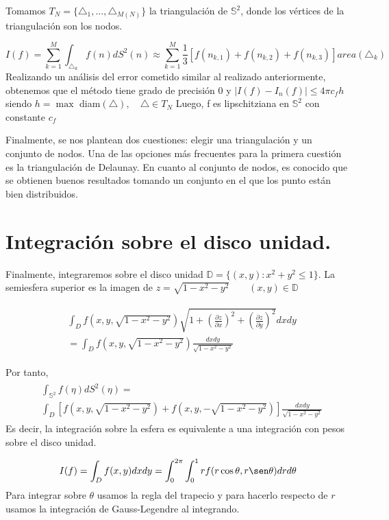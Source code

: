 \medskip
Tomamos $T_N=\{\triangle_1,...,\triangle_{M(N)}\}$ la triangulación de $\mathds{S}^2$, donde los vértices de la triangulación son los nodos.

$$
I(f) = \sum_{k=1}^{M} \int_{\triangle_k} f(n)dS^2(n) \approx  \sum_{k=1}^{M} \frac{1}{3}[f(n_{k,1})+f(n_{k,2})+f(n_{k,3})] area(\triangle_k)
$$
Realizando un análisis del error cometido similar al realizado anteriormente, obtenemos que el método tiene grado de precisión 0 y 
$|I(f)-I_n(f)|\le 4\pi c_f h$ siendo $h=\max$ diam$(\triangle), \quad \triangle\in T_N$
Luego, f es lipschitziana en $\mathds{S}^2$ con constante $ c_f$

Finalmente, se nos plantean dos cuestiones: elegir una triangulación y un conjunto de nodos. Una de las opciones más frecuentes para la primera cuestión es la triangulación de Delaunay. En cuanto al conjunto de nodos, es conocido que se obtienen buenos resultados tomando un conjunto en el que los punto están bien distribuidos.


\section{Integración sobre el disco unidad.}
Finalmente, integraremos sobre el disco unidad $\mathds{D}=\{(x,y):x^2+y^2 \le 1\}.$
La semiesfera superior es la imagen de 
$z=\sqrt{1-x^2-y^2} \qquad (x,y)\in \mathds{D}$

\begin{gather*}
\begin{aligned}
&\int_{D}f(x,y,\sqrt{1-x^2-y^2})\sqrt{1+(\frac{\partial z}{\partial x})^2+(\frac{\partial z}{\partial y})^2} dx dy \\ 
&= \int_D f(x,y,\sqrt{1-x^2-y^2})\frac{dx dy}{\sqrt{1-x^2-y^2}}
\end{aligned}
\end{gather*}
	
Por tanto,
\begin{gather*}
\begin{aligned}
&\int_{\mathds{S}^2}f(\eta) dS^2(\eta)  =\\ &\int_D \left[f(x,y,\sqrt{1-x^2-y^2})+f(x,y,-\sqrt{1-x^2-y^2})\right]\frac{dx dy}{\sqrt{1-x^2-y^2}}
\end{aligned}
\end{gather*}  
Es decir, la integración sobre la esfera es equivalente a una integración con pesos sobre el disco unidad.


$$I(f)=\int_{D} f(x,y) dxdy = \int_{0}^{2\pi}\int_{0}^{1} rf(r\cos\theta,r\sen\theta)drd\theta $$
Para integrar sobre $\theta$ usamos la regla del trapecio y para hacerlo respecto de $r$ usamos la integración de Gauss-Legendre al integrando.

